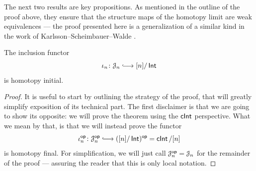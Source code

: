 The next two results are key propositions. As mentioned in the outline of the proof above, they ensure that the structure maps of the homotopy limit are weak equivalences — the proof presented here is a generalization of a similar kind in the work of Karlsson--Scheimbauer--Walde \cite{KSW25}. 

\begin{proposition}\label{ch2:: prop: hom initial}
    The inclusion functor 
    \begin{equation} 
        \iota_n\maps \cJ_n \xlonghookra{\,\,\,\,\,} [n]/\Int 
    \end{equation} 
    is homotopy initial. 
\end{proposition} 
\begin{proof}
     It is useful to start by outlining the strategy of the proof, that will greatly simplify exposition of its technical part. The first disclaimer is that we are going to show its opposite: we will prove the theorem using the $\operatorname{\mathsf{cInt}}$ perspective. What we mean by that, is that we will instead prove the functor 
     \begin{equation} 
        \iota_{n}^{\op} \maps \cJ_{n}^{\op} \xlonghookra{\,\,\,\,} ([n]/\Int)^{\op} = \cInt/[n] 
    \end{equation} is homotopy final. For simplification, we will just call $\mathcal J_n^{\mathsf{op}} = \mathcal J_n$ for the remainder of the proof — assuring the reader that this is only local notation. 
    

\end{proof}
